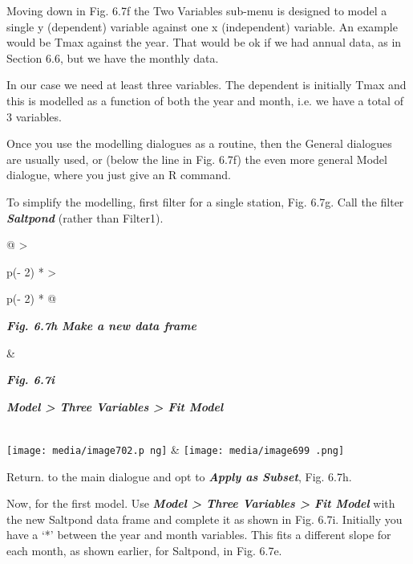 \documentclass[
  letterpaper,
  DIV=11,
  numbers=noendperiod]{scrreprt}
\begin{document}
Moving down in Fig. 6.7f the Two Variables sub-menu is designed to model
a single y (dependent) variable against one x (independent) variable. An
example would be Tmax against the year. That would be ok if we had
annual data, as in Section 6.6, but we have the monthly data.

In our case we need at least three variables. The dependent is initially
Tmax and this is modelled as a function of both the year and month, i.e.
we have a total of 3 variables.

Once you use the modelling dialogues as a routine, then the General
dialogues are usually used, or (below the line in Fig. 6.7f) the even
more general Model dialogue, where you just give an R command.

To simplify the modelling, first filter for a single station, Fig. 6.7g.
Call the filter \textbf{\emph{Saltpond}} (rather than Filter1).

\begin{longtable}[]{@{}
  >{\raggedright\arraybackslash}p{(\columnwidth - 2\tabcolsep) * }
  >{\raggedright\arraybackslash}p{(\columnwidth - 2\tabcolsep) * }@{}}
\toprule\noalign{}
\begin{minipage}[b]{\linewidth}\raggedright
\textbf{\emph{Fig. 6.7h Make a new data frame}}
\end{minipage} & \begin{minipage}[b]{\linewidth}\raggedright
\textbf{\emph{Fig. 6.7i}}

\textbf{\emph{Model \textgreater{} Three Variables \textgreater{} Fit
Model}}
\end{minipage} \\
\midrule\noalign{}
\endhead
\bottomrule\noalign{}
\endlastfoot
\texttt{[image: media/image702.p ng]}
&
\texttt{[image: media/image699 .png]} \\
\end{longtable}

Return. to the main dialogue and opt to \textbf{\emph{Apply as Subset}},
Fig. 6.7h.

Now, for the first model. Use \textbf{\emph{Model \textgreater{} Three
Variables \textgreater{} Fit Model}} with the new Saltpond data frame
and complete it as shown in Fig. 6.7i. Initially you have a `*' between
the year and month variables. This fits a different slope for each
month, as shown earlier, for Saltpond, in Fig. 6.7e.
\end{document}
